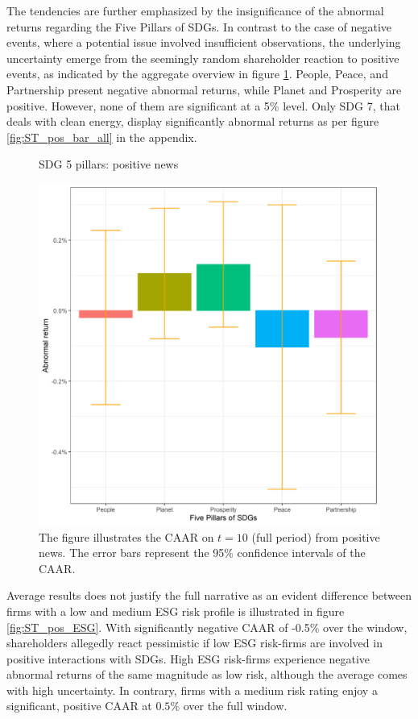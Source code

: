 The tendencies are further emphasized by the insignificance of the abnormal returns regarding the Five Pillars of SDGs. In contrast to the case of negative events, where a potential issue involved insufficient observations, the underlying uncertainty emerge from the seemingly random shareholder reaction to positive events, as indicated by the aggregate overview in figure \ref{fig:ST_pos_bar}. People, Peace, and Partnership present negative abnormal returns, while Planet and Prosperity are positive. However, none of them are significant at a 5\% level. Only SDG 7, that deals with clean energy, display significantly abnormal returns as per figure \ref{fig:ST_pos_bar_all} in the appendix. 

\begin{figure} [H]
    \centering
    \caption{SDG 5 pillars: positive news}
    \includegraphics[scale=0.6]{Projekt/1.Figures analysis/ST_positive_sdg_bar_groups_0.png}
    \caption*{\footnotesize The figure illustrates the CAAR on $t = 10$ (full period) from positive news. The error bars represent the 95\% confidence intervals of the CAAR.}
    \label{fig:ST_pos_bar}
\end{figure}

 
Average results does not justify the full narrative as an evident difference between firms with a low and medium ESG risk profile is illustrated in figure \ref{fig:ST_pos_ESG}. With significantly negative CAAR of -0.5\% over the window, shareholders allegedly react pessimistic if low ESG risk-firms are involved in positive interactions with SDGs. High ESG risk-firms experience negative abnormal returns of the same magnitude as low risk, although the average comes with high uncertainty. In contrary, firms with a medium risk rating enjoy a significant, positive CAAR at $0.5\%$ over the full window. 

